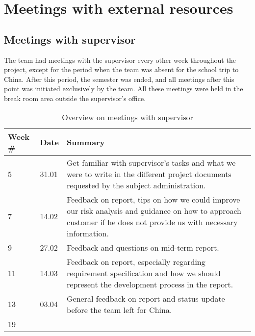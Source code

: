 \chapter{Meetings with external resources}

\section{Meetings with supervisor}
The team had meetings with the supervisor every other week throughout the project, except for the period when the team was absent for the school trip to China. After this period, the semester was ended, and all meetings after this point was initiated exclusively by the team. All these meetings were held in the break room area outside the supervisor's office.

\begin{table}[H]
\centering
\begin{tabular}{|l|l|p{12.6cm}|}
\hline
\textbf{Week \#} & \textbf{Date}&\textbf{Summary}\\\hline
5& 31.01&Get familiar with supervisor's tasks and what we were to write in the different project documents requested by the subject administration.\\\hline
7 &14.02&Feedback on report, tips on how we could improve our risk analysis and guidance on how to approach customer if he does not provide us with necessary information.\\\hline
9 &27.02& Feedback and questions on mid-term report.\\\hline
11 &14.03& Feedback on report, especially regarding requirement specification and how we should represent the development process in the report.\\\hline
13 &03.04&General feedback on report and status update before the team left for China.\\\hline
19&&\\\hline
\end{tabular}
\caption{Overview on meetings with supervisor}
\end{table}

